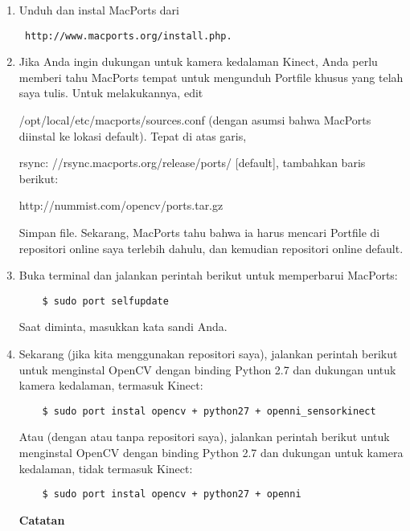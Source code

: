 \begin{enumerate}
	\item Unduh dan instal MacPorts dari \begin{verbatim} http://www.macports.org/install.php. \end{verbatim}
	\item Jika Anda ingin dukungan untuk kamera kedalaman Kinect, Anda perlu memberi tahu MacPorts tempat untuk mengunduh Portfile khusus yang telah saya tulis. Untuk melakukannya, edit

	/opt/local/etc/macports/sources.conf (dengan asumsi bahwa MacPorts diinstal ke lokasi default). Tepat di atas garis,

	rsync: //rsync.macports.org/release/ports/ [default], tambahkan baris berikut:

	http://nummist.com/opencv/ports.tar.gz

	Simpan file. Sekarang, MacPorts tahu bahwa ia harus mencari Portfile di repositori online saya terlebih dahulu, dan kemudian repositori online default.
	\item Buka terminal dan jalankan perintah berikut untuk memperbarui MacPorts:
	\begin{verbatim}
	$ sudo port selfupdate
	\end{verbatim}
	Saat diminta, masukkan kata sandi Anda.
	\item Sekarang (jika kita menggunakan repositori saya), jalankan perintah berikut untuk menginstal OpenCV dengan binding Python 2.7 dan dukungan untuk kamera kedalaman, termasuk Kinect:
	\begin{verbatim}
	$ sudo port instal opencv + python27 + openni_sensorkinect
	\end{verbatim}
	Atau (dengan atau tanpa repositori saya), jalankan perintah berikut untuk menginstal OpenCV dengan binding Python 2.7 dan dukungan untuk kamera kedalaman, tidak termasuk Kinect:
	\begin{verbatim}
	$ sudo port instal opencv + python27 + openni
	\end{verbatim}

	\textbf{Catatan}


\end{enumerate}
